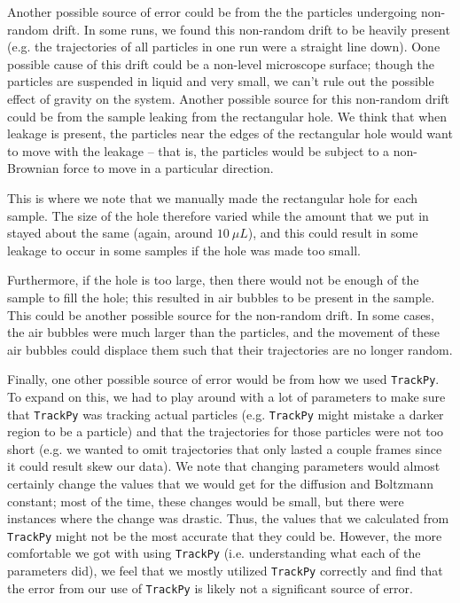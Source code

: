 \documentclass[twocolumn,amsmath,amssymb,pra, floatfix]{revtex4-2}
\begin{document}
Another possible source of error could be from the the particles undergoing non-random drift. In some runs, we found this non-random drift to be heavily present (e.g. the trajectories of all particles in one run were a straight line down). Oone possible cause of this drift could be a non-level microscope surface; though the particles are suspended in liquid and very small, we can't rule out the possible effect of gravity on the system. Another possible source for this non-random drift could be from the sample leaking from the rectangular hole. We think that when leakage is present, the particles near the edges of the rectangular hole would want to move with the leakage -- that is, the particles would be subject to a non-Brownian force to move in a particular direction.

This is where we note that we manually made the rectangular hole for each sample. The size of the hole therefore varied while the amount that we put in stayed about the same (again, around $10 \ \si{\mu L}$), and this could result in some leakage to occur in some samples if the hole was made too small. 

Furthermore, if the hole is too large, then there would not be enough of the sample to fill the hole; this resulted in air bubbles to be present in the sample. This could be another possible source for the non-random drift. In some cases, the air bubbles were much larger than the particles, and the movement of these air bubbles could displace them such that their trajectories are no longer random. 

Finally, one other possible source of error would be from how we used \texttt{TrackPy}. To expand on this, we had to play around with a lot of parameters to make sure that \texttt{TrackPy} was tracking actual particles (e.g. \texttt{TrackPy} might mistake a darker region to be a particle) and that the trajectories for those particles were not too short (e.g. we wanted to omit trajectories that only lasted a couple frames since it could result skew our data). We note that changing parameters would almost certainly change the values that we would get for the diffusion and Boltzmann constant; most of the time, these changes would be small, but there were instances where the change was drastic. Thus, the values that we calculated from \texttt{TrackPy} might not be the most accurate that they could be. However, the more comfortable we got with using \texttt{TrackPy} (i.e. understanding what each of the parameters did), we feel that we mostly utilized \texttt{TrackPy} correctly and find that the error from our use of \texttt{TrackPy} is likely not a significant source of error.
\end{document}
